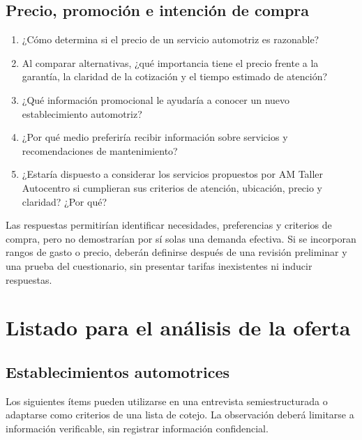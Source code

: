 \documentclass[12pt,letterpaper,oneside]{article}
\begin{document}
\subsection{Precio, promoción e intención de compra}

\begin{enumerate}
    \item ¿Cómo determina si el precio de un servicio automotriz es razonable?
    \item Al comparar alternativas, ¿qué importancia tiene el precio frente a la garantía, la claridad de la cotización y el tiempo estimado de atención?
    \item ¿Qué información promocional le ayudaría a conocer un nuevo establecimiento automotriz?
    \item ¿Por qué medio preferiría recibir información sobre servicios y recomendaciones de mantenimiento?
    \item ¿Estaría dispuesto a considerar los servicios propuestos por AM Taller Autocentro si cumplieran sus criterios de atención, ubicación, precio y claridad? ¿Por qué?
\end{enumerate}

Las respuestas permitirían identificar necesidades, preferencias y criterios de compra, pero no demostrarían por sí solas una demanda efectiva. Si se incorporan rangos de gasto o precio, deberán definirse después de una revisión preliminar y una prueba del cuestionario, sin presentar tarifas inexistentes ni inducir respuestas.

\section{Listado para el análisis de la oferta}

\subsection{Establecimientos automotrices}

Los siguientes ítems pueden utilizarse en una entrevista semiestructurada o adaptarse como criterios de una lista de cotejo. La observación deberá limitarse a información verificable, sin registrar información confidencial.
\end{document}
